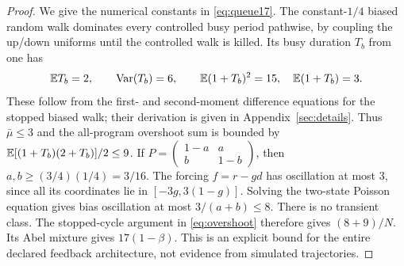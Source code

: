 \begin{proof}
We give the numerical constants in \eqref{eq:queue17}. The constant-$1/4$ biased random walk dominates every controlled busy period pathwise, by coupling the up/down uniforms until the controlled walk is killed. Its busy duration $T_b$ from one has
\[
 \mathbb E T_b=2,\qquad \operatorname{Var}(T_b)=6,\qquad
 \mathbb E(1+T_b)^2=15,\quad \mathbb E(1+T_b)=3.
\]
These follow from the first- and second-moment difference equations for the stopped biased walk; their derivation is given in Appendix~\ref{sec:details}. Thus $\bar\mu\le3$ and the all-program overshoot sum is bounded by
$\mathbb E[(1+T_b)(2+T_b)]/2\le9$.
If $P=\left(\begin{smallmatrix}1-a&a\\ b&1-b\end{smallmatrix}\right)$, then $a,b\ge(3/4)(1/4)=3/16$. The forcing $f=r-gd$ has oscillation at most $3$, since all its coordinates lie in $[-3g,3(1-g)]$. Solving the two-state Poisson equation gives bias oscillation at most $3/(a+b)\le8$. There is no transient class. The stopped-cycle argument in \eqref{eq:overshoot} therefore gives $(8+9)/N$. Its Abel mixture gives $17(1-\beta)$. This is an explicit bound for the entire declared feedback architecture, not evidence from simulated trajectories.
\end{proof}

